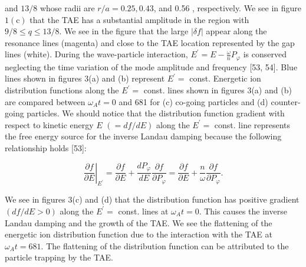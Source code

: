 \documentclass[10pt]{article}
\begin{document}
and $13 / 8$ whose radii are $r / a=0.25,0.43$, and 0.56 , respectively. We see in figure $1(\mathrm{c})$ that the TAE has a substantial amplitude in the region with $9 / 8 \leqslant q \leqslant 13 / 8$. We see in the figure that the large $|\delta f|$ appear along the resonance lines (magenta) and close to the TAE location represented by the gap lines (white). During the wave-particle interaction, $E^{\prime}=E-\frac{\omega}{n} P_{\varphi}$ is conserved neglecting the time variation of the mode amplitude and frequency [53, 54]. Blue lines shown in figures 3(a) and (b) represent $E^{\prime}=$ const. Energetic ion distribution functions along the $E^{\prime}=$ const. lines shown in figures 3(a) and (b) are compared between $\omega_{A} t=0$ and 681 for (c) co-going particles and (d) counter-going particles. We should notice that the distribution function gradient with respect to kinetic energy $E$ $(=d f / d E)$ along the $E^{\prime}=$ const. line represents the free energy source for the inverse Landau damping because the following relationship holds [53]:

$$
\left.\frac{\partial f}{\partial E}\right|_{E^{\prime}}=\frac{\partial f}{\partial E}+\frac{d P_{\varphi}}{d E} \frac{\partial f}{\partial P_{\varphi}}=\frac{\partial f}{\partial E}+\frac{n}{\omega} \frac{\partial f}{\partial P_{\varphi}} .
$$

We see in figures 3(c) and (d) that the distribution function has positive gradient $(d f / d E>0)$ along the $E^{\prime}=$ const. lines at $\omega_{A} t=0$. This causes the inverse Landau damping and the growth of the TAE. We see the flattening of the energetic ion distribution function due to the interaction with the TAE at $\omega_{A} t=681$. The flattening of the distribution function can be attributed to the particle trapping by the TAE.
\end{document}
